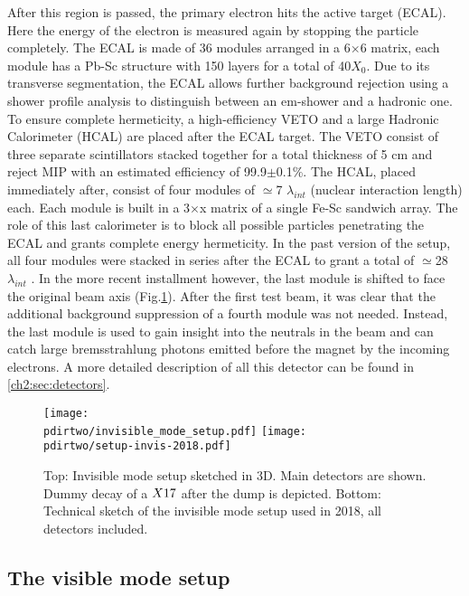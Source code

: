 After this region is passed, the primary electron hits the active target (ECAL). Here the energy of the electron is measured again by stopping the particle completely. The ECAL is made of 36 modules arranged in a 6$\times$6 matrix, each module has a Pb-Sc structure with 150 layers for a total of 40$X_0$. Due to its transverse segmentation, the ECAL allows further background rejection using a shower profile analysis to distinguish between an em-shower and a hadronic one. To ensure complete hermeticity, a high-efficiency VETO and a large Hadronic Calorimeter (HCAL) are placed after the ECAL target. The VETO consist of three separate scintillators stacked together for a total thickness of 5 \si{\centi\meter} and reject MIP with an estimated efficiency of 99.9$\pm$0.1\%. The HCAL, placed immediately after, consist of four modules of $\simeq$7 $\lambda_{int}$ (nuclear interaction length) each. Each module is built in a 3$\times$x matrix of a single Fe-Sc sandwich array. The role of this last calorimeter is to block all possible particles penetrating the ECAL and grants complete energy hermeticity. In the past version of the setup, all four modules were stacked in series after the ECAL to grant a total of $\simeq$28 $\lambda_{int}$ \cite{Banerjee:2016tad}. In the more recent installment however, the last module is shifted to face the original beam axis (Fig.\ref{fig:setup-invis-2018}). After the first test beam, it was clear that the additional background suppression of a fourth module was not needed. Instead, the last module is used to gain insight into the neutrals in the beam and can catch large bremsstrahlung photons emitted before the magnet by the incoming electrons. A more detailed description of all this detector can be found in \ref{ch2:sec:detectors}.

\begin{figure}[tbh!]
  \centering
  \texttt{[image: \\pdirtwo/invisible\_mode\_setup.pdf]}
\texttt{[image: \\pdirtwo/setup-invis-2018.pdf]}
\caption[invisible mode setup 2018]{Top: Invisible mode setup sketched in 3D. Main detectors are shown. Dummy decay of a $X17$ after the dump is depicted. Bottom: Technical sketch of the invisible mode setup used in 2018, all detectors included.}
\label{fig:setup-invis-2018}
\end{figure}

\subsection{The visible mode setup}
\label{ch2:sec:vismode}

